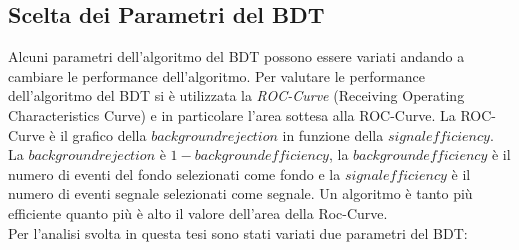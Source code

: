     

\subsection{Scelta dei Parametri del BDT}
Alcuni parametri dell'algoritmo del BDT possono essere variati andando a cambiare le performance dell'algoritmo.
Per valutare le performance dell'algoritmo del BDT si è utilizzata la \textit{ROC-Curve} (Receiving Operating Characteristics Curve) e in particolare l'area sottesa alla ROC-Curve. La ROC-Curve è il grafico della $background rejection$ in funzione della $signal efficiency$. La $background rejection$ è $1 - background efficiency$, la $background efficiency$ è il numero di eventi del fondo selezionati come fondo e la $signal efficiency$ è il numero di eventi segnale selezionati come segnale. Un algoritmo è tanto più efficiente quanto più è alto il valore dell'area della Roc-Curve.
\\Per l'analisi svolta in questa tesi sono stati variati due parametri del BDT:
